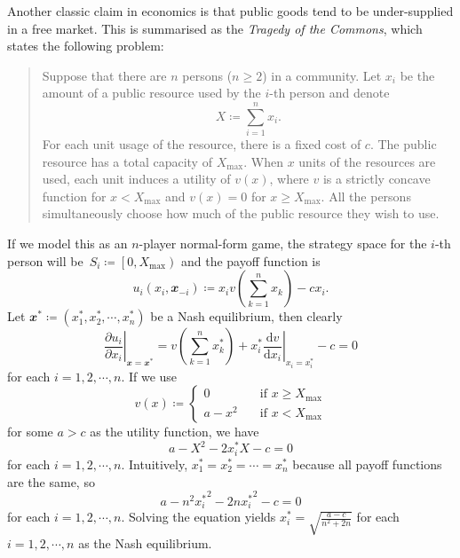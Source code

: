 \documentclass[math]{amznotes}
\theoremstyle{remark}
\renewcommand{\d}{\mathrm{d}}
\begin{document}
Another classic claim in economics is that public goods tend to be under-supplied in a free market. This is summarised as the \textit{Tragedy of the Commons}, which states the following problem:
\begin{quote}
    Suppose that there are $n$ persons ($n \geq 2$) in a community. Let $x_i$ be the amount of a public resource used by the $i$-th person and denote 
    \begin{equation*}
        X \coloneqq \sum_{i = 1}^nx_i.
    \end{equation*}
    For each unit usage of the resource, there is a fixed cost of $c$. The public resource has a total capacity of $X_{\max}$. When $x$ units of the resources are used, each unit induces a utility of $v\left(x\right)$, where $v$ is a strictly concave function for $x < X_{\max}$ and $v\left(x\right) = 0$ for $x \geq X_{\max}$. All the persons simultaneously choose how much of the public resource they wish to use.
\end{quote}
If we model this as an $n$-player normal-form game, the strategy space for the $i$-th person will be~$S_i \coloneqq \left[0, X_{\max}\right)$ and the payoff function is 
\begin{equation*}
    u_i\left(x_i, \mathbfit{x}_{-i}\right) \coloneqq x_iv\left(\sum_{k = 1}^{n}x_k\right) - cx_i.
\end{equation*}
Let $\mathbfit{x}^* \coloneqq \left(x_1^*, x_2^*, \cdots, x_n^*\right)$ be a Nash equilibrium, then clearly
\begin{equation*}
    \left.\frac{\partial u_i}{\partial x_i}\right\rvert_{\mathbfit{x} = \mathbfit{x}^*} = v\left(\sum_{k = 1}^{n}x_k^*\right) + x_i^*\left.\frac{\d v}{\d x_i}\right\rvert_{x_i = x_i^*} - c = 0
\end{equation*}
for each $i = 1, 2, \cdots, n$. If we use 
\begin{equation*}
    v\left(x\right) \coloneqq \begin{cases}
        0 & \quad\textrm{if } x \geq X_{\max} \\
        a - x^2 & \quad\textrm{if } x < X_{\max}
    \end{cases}
\end{equation*}
for some $a > c$ as the utility function, we have 
\begin{equation*}
    a - X^2 - 2x_i^*X - c = 0
\end{equation*}
for each $i = 1, 2, \cdots, n$. Intuitively, $x_1^* = x_2^* = \cdots = x_n^*$ because all payoff functions are the same, so 
\begin{equation*}
    a - n^2{x_i^*}^2 - 2n{x_i^*}^2 - c = 0
\end{equation*}
for each $i = 1, 2, \cdots, n$. Solving the equation yields $x_i^* = \sqrt{\frac{a - c}{n^2 + 2n}}$ for each $i = 1, 2, \cdots, n$ as the Nash equilibrium. 
\end{document}
